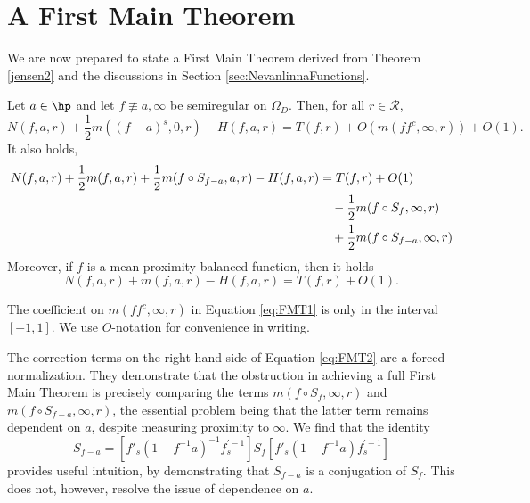 \documentclass{amsart}
\begin{document}
\section{A First Main Theorem}\label{sec:FirstMainTheorem}

We are now prepared to state a First Main Theorem derived from Theorem \ref{jensen2} and the discussions in Section \ref{sec:NevanlinnaFunctions}. 

\begin{teo}\label{teo:FMT}
    Let $a\in\hp$ and let $f\not\equiv a,\infty$ be semiregular on $\Omega_D$. Then, for all $r\in\mathcal R$, 
    \begin{equation}\label{eq:FMT1} N(f,a,r)+\frac{1}{2}m((f-a)^s,0,r)-H(f,a,r)=T(f,r)+O(m(ff^c,\infty,r))+O(1).\end{equation} 
    It also holds,
    \begin{align}\label{eq:FMT2} N(f,a,r)+\frac{1}{2}m(f,a,r)+\frac{1}{2}m(f\circ S_{f-a},a,r)-H(f,a,r)&=T(f,r)+O(1) \\&\quad -\frac{1}{2}m(f\circ S_f,\infty,r) \notag\\
    &\quad+\frac{1}{2}m(f\circ S_{f-a},\infty,r)\notag\end{align}
    Moreover, if $f$ is a mean proximity balanced function, then it holds 
    \begin{equation}\label{eq:FMT3} N(f,a,r)+m(f,a,r)-H(f,a,r)=T(f,r)+O(1). \end{equation}
\end{teo}

\begin{remark}\label{remark:FMT1}
    The coefficient on $m(ff^c,\infty,r)$ in Equation \ref{eq:FMT1} is only in the interval $[-1,1]$. We use $O$-notation for convenience in writing.   
\end{remark}

\begin{remark}
    The correction terms on the right-hand side of Equation \ref{eq:FMT2} are a forced normalization. They demonstrate that the obstruction in achieving a full First Main Theorem is precisely comparing the terms $m(f\circ S_f,\infty,r)$ and $m(f\circ S_{f-a},\infty,r)$, the essential problem being that the latter term remains dependent on $a$, despite measuring proximity to $\infty$. We find that the identity \[S_{f-a}=[f'_s(1-f^{-1}a)^{-1}f^{'-1}_s] S_f[f'_s(1-f^{-1}a)f^{'-1}_s]\] provides useful intuition, by demonstrating that $S_{f-a}$ is a conjugation of $S_f$. This does not, however, resolve the issue of dependence on $a$. 
\end{remark}
\end{document}
